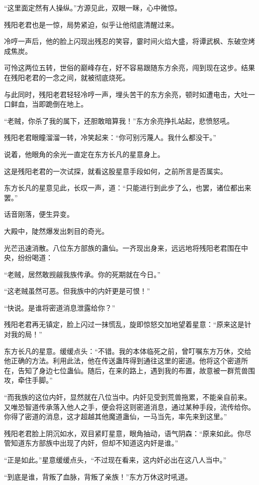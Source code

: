 \begin{this_body}
“这里面定然有人操纵。”方源见此，双眼一眯，心中微惊。

残阳老君也是一惊，局势紧迫，似乎让他彻底清醒过来。

冷哼一声后，他的脸上闪现出残忍的笑容，霎时间火焰大盛，将谭武枫、东破空烤成焦炭。

可怜这两位五转，世俗的巅峰存在，好不容易跟随东方余亮，闯到现在这步。结果在残阳老君的一念之间，就被彻底烧死。

与此同时，残阳老君轻轻冷哼一声，埋头苦干的东方余亮，顿时如遭电击，大吐一口鲜血，当即跪倒在地上。

“老贼，你杀了我的属下，还胆敢暗算我！”东方余亮挣扎站起，悲愤怒吼。

残阳老君眼瞳溜溜一转，冷笑起来：“你可别污蔑人。我什么都没干。”

说着，他眼角的余光一直定在东方长凡的星意身上。

这是残阳老君的一次试探，就看这股星意手段如何，之前所言是否属实。

东方长凡的星意见此，长叹一声，道：“只能进行到此步了么，也罢，诸位都出来罢。”

话音刚落，便生异变。

大殿中，陡然爆发出刺目的奇光。

光芒迅速消散。八位东方部族的蛊仙。一齐现出身来，远远地将残阳老君围在中央，纷纷喝道：

“老贼，居然敢觊觎我族传承。你的死期就在今日。”

“这老贼虽然可恶。但我族中的内奸更是可恨！”

“快说。是谁将密道消息泄露给你？”

残阳老君再无镇定，脸上闪过一抹慌乱，旋即惊怒交加地望着星意：“原来这是针对我的局！”

东方长凡的星意。缓缓点头：“不错。我的本体临死之前，曾叮嘱东方万休，交给他正确的方法。利用此法，他在传送蛊阵得到通往这里的密道。他将这个密道所在，告知了身边七位蛊仙。随后，在来的路上，遇到我的布置，故意被一群荒兽围攻，牵住手脚。”

“而我族的这位内奸，显然就在八位当中。内奸见受到荒兽拖累，不能亲自前来。又唯恐智道传承落入他人之手，便会将这则密道消息，通过某种手段，流传给你。你得了密道的消息，这才超越其他魔道蛊仙，一马当先，率先来到这里。”

残阳老君脸上阴沉如水，双目紧盯星意，眼角抽动，语气阴森：“原来如此。你尽管知道东方部族中出现了内奸，但却不知道这内奸是谁。”

“正是如此。”星意缓缓点头，“不过现在看来，这内奸必出在这八人当中。”

“到底是谁，背叛了血脉，背叛了亲族！”东方万休这时吼道。


\end{this_body}
